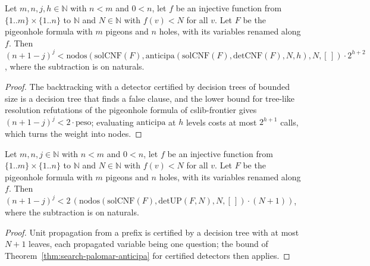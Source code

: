 \begin{theorem}
  \label{thm:search-palomar-anticipa}
  \leanok
  Let $m, n, j, h \in \mathbb{N}$ with $n < m$ and $0 < n$, let $f$ be an injective function from
  $\{1..m\} \times \{1..n\}$ to $\mathbb{N}$ and $N \in \mathbb{N}$ with $f(v) < N$ for all $v$. Let
  $F$ be the pigeonhole formula with $m$ pigeons and $n$ holes, with its variables renamed along
  $f$. Then $(n + 1 - j)^j < \mathrm{nodos}(\mathrm{solCNF}(F), \mathrm{anticipa}(\mathrm{solCNF}(F),
  \mathrm{detCNF}(F), N, h), N, [\,]) \cdot 2^{h+2}$, where the subtraction is on naturals.
  \own{}
\end{theorem}

\begin{proof}
  \leanok
  The backtracking with a detector certified by decision trees of bounded size is a decision tree
  that finds a false clause, and the lower bound for tree-like resolution refutations of the
  pigeonhole formula of cslib-frontier gives $(n+1-j)^j < 2 \cdot \mathrm{peso}$; evaluating
  $\mathrm{anticipa}$ at $h$ levels costs at most $2^{h+1}$ calls, which turns the weight into nodes.
\end{proof}

\begin{theorem}
  \label{thm:search-palomar-detup}
  \leanok
  Let $m, n, j \in \mathbb{N}$ with $n < m$ and $0 < n$, let $f$ be an injective function from
  $\{1..m\} \times \{1..n\}$ to $\mathbb{N}$ and $N \in \mathbb{N}$ with $f(v) < N$ for all $v$. Let
  $F$ be the pigeonhole formula with $m$ pigeons and $n$ holes, with its variables renamed along
  $f$. Then $(n + 1 - j)^j < 2\,(\mathrm{nodos}(\mathrm{solCNF}(F), \mathrm{detUP}(F, N), N, [\,])
  \cdot (N + 1))$, where the subtraction is on naturals.
  \own{}
\end{theorem}

\begin{proof}
  \leanok
  Unit propagation from a prefix is certified by a decision tree with at most $N + 1$ leaves, each
  propagated variable being one question; the bound of Theorem~\ref{thm:search-palomar-anticipa}
  for certified detectors then applies.
\end{proof}

